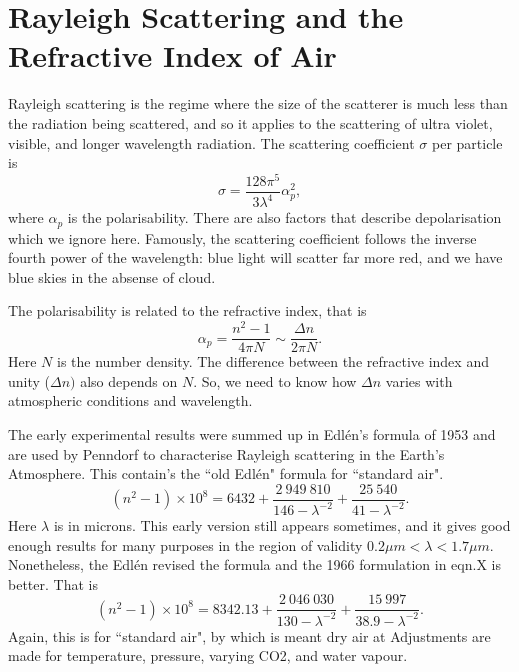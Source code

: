 \documentclass[12pt]{article}
\begin{document}
\section{Rayleigh Scattering and the Refractive Index of Air}

Rayleigh scattering is the regime where the size of the scatterer is much less than the radiation
being scattered, and so it applies to the scattering of ultra violet, visible, and longer wavelength
radiation. The scattering coefficient $\sigma$ per particle is
\begin{equation}
\sigma=\frac{128 \pi^5}{3 \lambda^4} \alpha_p^2,
\end{equation}
where $\alpha_p$ is the polarisability. There are also
 factors that describe depolarisation \cite{Chandrasekhar:Mybib}
 which we ignore here. Famously, the scattering coefficient follows the inverse fourth power
of the wavelength: blue light will scatter far more red, and we have blue skies in the absense of
cloud.

The polarisability is related to the
refractive index, that is
\begin{equation}
\alpha_p=\frac{n^2-1}{ 4 \pi N} \sim \frac{\Delta n}{2 \pi N}.
\end{equation}
Here $N$ is the number density. The difference between the refractive index and unity ($\Delta n)$ also
depends on $N$. So, we need to know how $\Delta n$ varies with atmospheric conditions and wavelength.

The early experimental results were summed up in Edl\'{e}n's formula of 1953
\cite{Edlen1:Mybib} and are used by Penndorf \cite{PenndorfAir:Mybib} to characterise Rayleigh scattering in the
Earth's Atmosphere. This contain's the ``old Edl\'{e}n" formula for ``standard air".
\begin{equation}
(n^2-1)\times 10^8=6432+\frac{2\>949\>810}{146-\lambda^{-2}}+\frac{25\>540}{41-\lambda^{-2}}.
\end{equation}
Here $\lambda$ is in microns.
This early version still appears sometimes, and it gives good enough results for many purposes
 in the region of validity $0.2 \mu m < \lambda < 1.7 \mu m$. Nonetheless, the Edl\'{e}n revised the
formula \cite{Edlen2:Mybib} and the 1966 formulation in eqn.X is better. That is
\begin{equation}
(n^2-1)\times 10^8=8342.13+\frac{2\>046\>030}{130-\lambda^{-2}}+\frac{15\>997}{38.9-\lambda^{-2}}.
\end{equation}
Again, this is for ``standard air", by which is meant dry air at
Adjustments are made for temperature, pressure, varying CO2, and water vapour.
\end{document}
